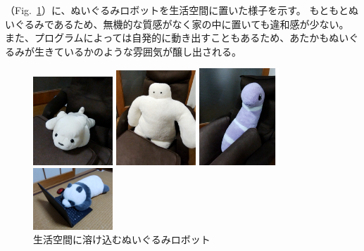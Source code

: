 \documentclass[uplatex,a4paper,12pt]{jsarticle}
\renewcommand{\figurename}{Fig.}
\newcommand{\figref}[1]{\figurename~\ref{#1}}
\begin{document}
（\figref{fig:mohutics:home}）に、ぬいぐるみロボットを生活空間に置いた様子を示す。
もともとぬいぐるみであるため、無機的な質感がなく家の中に置いても違和感が少ない。
また、プログラムによっては自発的に動き出すこともあるため、あたかもぬいぐるみが生きているかのような雰囲気が醸し出される。

\begin{figure}[htbp]
  \centering
  \begin{minipage}[c]{0.24\linewidth}
    \centering
    \includegraphics[keepaspectratio,width=3cm,clip]{images/mohutics/dog.png}
  \end{minipage}
  \begin{minipage}[c]{0.24\linewidth}
    \centering
    \includegraphics[keepaspectratio,width=3cm,clip]{images/mohutics/funio.png}
  \end{minipage}
  \begin{minipage}[c]{0.24\linewidth}
    \centering
    \includegraphics[keepaspectratio,width=3cm,clip]{images/mohutics/anago.png}
  \end{minipage}
  \begin{minipage}[c]{0.24\linewidth}
    \centering
    \includegraphics[keepaspectratio,width=3cm,clip]{images/mohutics/panda.png}
  \end{minipage}
  \caption{生活空間に溶け込むぬいぐるみロボット}
  \label{fig:mohutics:home}
\end{figure}
\end{document}
